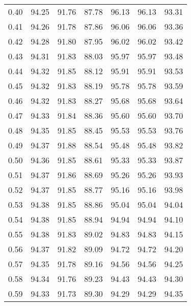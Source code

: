 \begin{tabular}{|c|c|c|c|c|c|c|}
      0.40 &     94.25 &     91.76 &      87.78 &   96.13 &      96.13 &         93.31 \\
      0.41 &     94.26 &     91.78 &      87.86 &   96.06 &      96.06 &         93.36 \\
      0.42 &     94.28 &     91.80 &      87.95 &   96.02 &      96.02 &         93.42 \\
      0.43 &     94.31 &     91.83 &      88.03 &   95.97 &      95.97 &         93.48 \\
      0.44 &     94.32 &     91.85 &      88.12 &   95.91 &      95.91 &         93.53 \\
      0.45 &     94.32 &     91.83 &      88.19 &   95.78 &      95.78 &         93.59 \\
      0.46 &     94.32 &     91.83 &      88.27 &   95.68 &      95.68 &         93.64 \\
      0.47 &     94.33 &     91.84 &      88.36 &   95.60 &      95.60 &         93.70 \\
      0.48 &     94.35 &     91.85 &      88.45 &   95.53 &      95.53 &         93.76 \\
      0.49 &     94.37 &     91.88 &      88.54 &   95.48 &      95.48 &         93.82 \\
      0.50 &     94.36 &     91.85 &      88.61 &   95.33 &      95.33 &         93.87 \\
      0.51 &     94.37 &     91.86 &      88.69 &   95.26 &      95.26 &         93.93 \\
      0.52 &     94.37 &     91.85 &      88.77 &   95.16 &      95.16 &         93.98 \\
      0.53 &     94.38 &     91.85 &      88.86 &   95.04 &      95.04 &         94.04 \\
      0.54 &     94.38 &     91.85 &      88.94 &   94.94 &      94.94 &         94.10 \\
      0.55 &     94.38 &     91.83 &      89.02 &   94.83 &      94.83 &         94.15 \\
      0.56 &     94.37 &     91.82 &      89.09 &   94.72 &      94.72 &         94.20 \\
      0.57 &     94.35 &     91.78 &      89.16 &   94.56 &      94.56 &         94.25 \\
      0.58 &     94.34 &     91.76 &      89.23 &   94.43 &      94.43 &         94.30 \\
      0.59 &     94.33 &     91.73 &      89.30 &   94.29 &      94.29 &         94.35 \\

\end{tabular}
